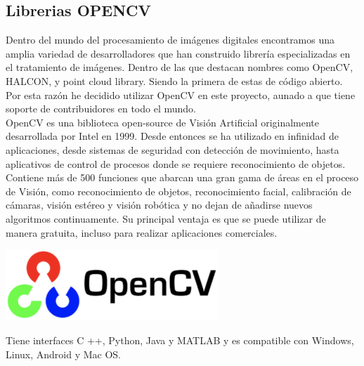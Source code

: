 \subsection{Librerias OPENCV}
Dentro del mundo del procesamiento de imágenes digitales encontramos una amplia variedad
de desarrolladores que han construido librería especializadas en el tratamiento de
imágenes. Dentro de las que destacan nombres como OpenCV, HALCON, y point cloud library.
Siendo la primera de estas de código abierto. Por esta razón he decidido utilizar
OpenCV en este proyecto, aunado a que tiene soporte de contribuidores en todo el mundo.\\
OpenCV es una biblioteca open-source de Visión Artificial originalmente desarrollada por 
Intel en 1999. Desde entonces se ha utilizado en infinidad de aplicaciones, desde 
sistemas de seguridad con detección de movimiento, hasta aplicativos de control de 
procesos donde se requiere reconocimiento de objetos. Contiene más de 500 funciones 
que abarcan una gran gama de áreas en el proceso de Visión, como reconocimiento de 
objetos, reconocimiento facial, calibración de cámaras, visión estéreo y visión 
robótica y no dejan de añadirse nuevos algoritmos continuamente. Su principal ventaja 
es que se puede utilizar de manera gratuita, incluso para realizar aplicaciones 
comerciales.\cite{opencv}
\begin{center}
    \includegraphics[width=0.6\textwidth]{Capitulo2/Fig12.eps}
    \label{Fig9}
\end{center}
Tiene interfaces C ++, Python, Java y MATLAB y es compatible con Windows, Linux, 
Android y Mac OS.

